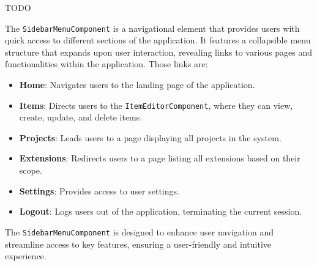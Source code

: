 TODO

The \texttt{SidebarMenuComponent} is a navigational element that provides users with quick access to different sections of the application.
It features a collapsible menu structure that expands upon user interaction, revealing links to various pages and functionalities within the application.
Those links are:

\begin{itemize}
    \item \textbf{Home}: Navigates users to the landing page of the application.
    \item \textbf{Items}: Directs users to the \texttt{ItemEditorComponent}, where they can view, create, update, and delete items.
    \item \textbf{Projects}: Leads users to a page displaying all projects in the system.
    \item \textbf{Extensions}: Redirects users to a page listing all extensions based on their scope.
    \item \textbf{Settings}: Provides access to user settings.
    \item \textbf{Logout}: Logs users out of the application, terminating the current session.
\end{itemize}

The \texttt{SidebarMenuComponent} is designed to enhance user navigation and streamline access to key features, ensuring a user-friendly and intuitive experience.

